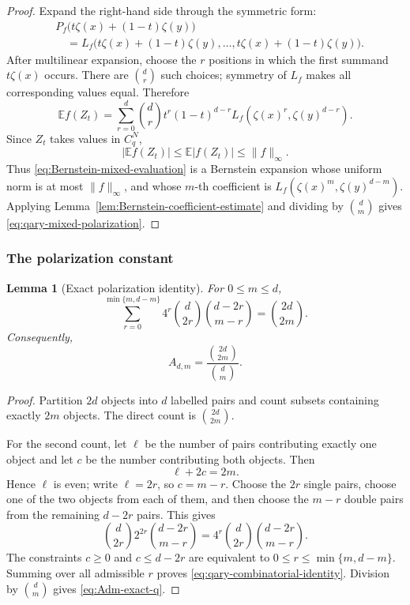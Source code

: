 \documentclass[11pt,a4paper]{article}
\numberwithin{equation}{section}
\theoremstyle{cleanplain}
\newtheorem{lemma}[lemma]{Lemma}
\theoremstyle{cleandefinition}
\theoremstyle{cleanremark}
\newcommand{\E}{\mathbb E}
\begin{document}
\begin{proof}
Expand the right-hand side through the symmetric form:
\begin{align*}
 &P_f\bigl(t\zeta(x)+(1-t)\zeta(y)\bigr)\\
 &\quad=L_f\bigl(t\zeta(x)+(1-t)\zeta(y),\ldots,
                  t\zeta(x)+(1-t)\zeta(y)\bigr).
\end{align*}
After multilinear expansion, choose the $r$ positions in which the first
summand $t\zeta(x)$ occurs.  There are $\binom dr$ such choices; symmetry of
$L_f$ makes all corresponding values equal.  Therefore
\begin{equation}\label{eq:Bernstein-mixed-evaluation}
 \E f(Z_t)
 =\sum_{r=0}^d\binom drt^r(1-t)^{d-r}
 L_f(\zeta(x)^r,\zeta(y)^{d-r}).
\end{equation}
Since $Z_t$ takes values in $C_q^N$,
\[
 |\E f(Z_t)|\leq\E|f(Z_t)|\leq\|f\|_\infty.
\]
Thus \eqref{eq:Bernstein-mixed-evaluation} is a Bernstein expansion whose
uniform norm is at most $\|f\|_\infty$, and whose $m$-th coefficient is
$L_f(\zeta(x)^m,\zeta(y)^{d-m})$.  Applying
Lemma~\ref{lem:Bernstein-coefficient-estimate} and dividing by $\binom dm$
gives \eqref{eq:qary-mixed-polarization}.
\end{proof}

\subsubsection{The polarization constant}

\begin{lemma}[Exact polarization identity]\label{lem:qary-combinatorial-identity}
For $0\leq m\leq d$,
\begin{equation}\label{eq:qary-combinatorial-identity}
 \sum_{r=0}^{\min\{m,d-m\}}
 4^r\binom d{2r}\binom{d-2r}{m-r}
 =\binom{2d}{2m}.
\end{equation}
Consequently,
\begin{equation}\label{eq:Adm-exact-q}
 A_{d,m}=\frac{\binom{2d}{2m}}{\binom dm}.
\end{equation}
\end{lemma}

\begin{proof}
Partition $2d$ objects into $d$ labelled pairs and count subsets containing
exactly $2m$ objects.  The direct count is $\binom{2d}{2m}$.

For the second count, let $\ell$ be the number of pairs contributing exactly one
object and let $c$ be the number contributing both objects.  Then
\[
 \ell+2c=2m.
\]
Hence $\ell$ is even; write $\ell=2r$, so $c=m-r$.  Choose the $2r$ single pairs,
choose one of the two objects from each of them, and then choose the $m-r$
double pairs from the remaining $d-2r$ pairs.  This gives
\[
 \binom d{2r}2^{2r}\binom{d-2r}{m-r}
 =4^r\binom d{2r}\binom{d-2r}{m-r}.
\]
The constraints $c\geq0$ and $c\leq d-2r$ are equivalent to
$0\leq r\leq\min\{m,d-m\}$.  Summing over all admissible $r$ proves
\eqref{eq:qary-combinatorial-identity}.  Division by $\binom dm$ gives
\eqref{eq:Adm-exact-q}.
\end{proof}
\end{document}
